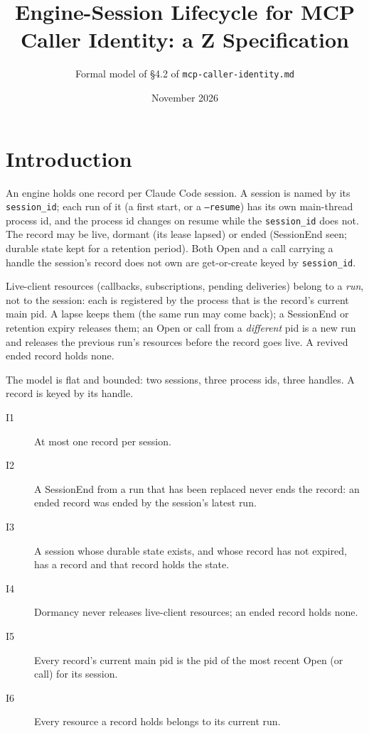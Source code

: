 \documentclass[a4paper,10pt,fleqn]{article}
\begin{document}
\title{Engine-Session Lifecycle for MCP Caller Identity: a Z Specification}
\author{Formal model of \S4.2 of \texttt{mcp-caller-identity.md}}
\date{November 2026}
\maketitle

\section{Introduction}

An engine holds one record per Claude Code session.  A session is named by its
\texttt{session\_id}; each run of it (a first start, or a \texttt{--resume})
has its own main-thread process id, and the process id changes on resume while
the \texttt{session\_id} does not.  The record may be live, dormant (its lease
lapsed) or ended (SessionEnd seen; durable state kept for a retention period).
Both Open and a call carrying a handle the session's record does not own are
get-or-create keyed by \texttt{session\_id}.

Live-client resources (callbacks, subscriptions, pending deliveries) belong to
a \emph{run}, not to the session: each is registered by the process that is
the record's current main pid.  A lapse keeps them (the same run may come
back); a SessionEnd or retention expiry releases them; an Open or call from a
\emph{different} pid is a new run and releases the previous run's resources
before the record goes live.  A revived ended record holds none.

The model is flat and bounded: two sessions, three process ids, three handles.
A record is keyed by its handle.

\begin{description}
 \item[I1] At most one record per session.
 \item[I2] A SessionEnd from a run that has been replaced never ends the
   record: an ended record was ended by the session's latest run.
 \item[I3] A session whose durable state exists, and whose record has not
   expired, has a record and that record holds the state.
 \item[I4] Dormancy never releases live-client resources; an ended record
   holds none.
 \item[I5] Every record's current main pid is the pid of the most recent Open
   (or call) for its session.
 \item[I6] Every resource a record holds belongs to its current run.
\end{description}
\end{document}
